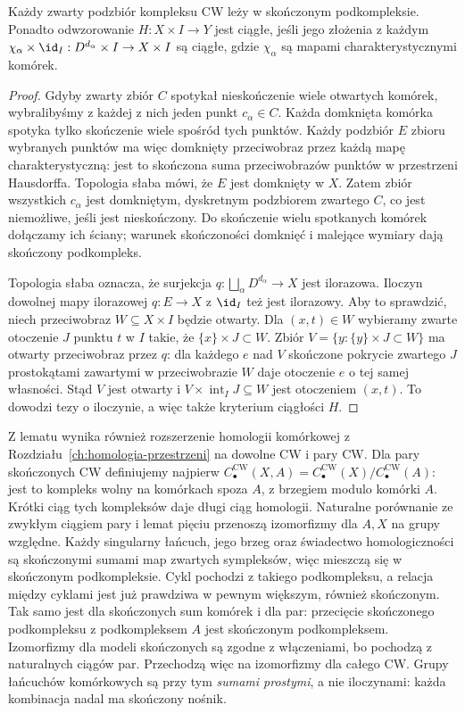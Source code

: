 \begin{lemat}
\label{lem:zwartosc-cw-pi}
Każdy zwarty podzbiór kompleksu CW leży w skończonym podkompleksie.
Ponadto odwzorowanie $H:X\times I\to Y$ jest ciągłe, jeśli jego złożenia
z każdym $\chi_\alpha\times\id_I:D^{d_\alpha}\times I\to X\times I$
są ciągłe, gdzie $\chi_\alpha$ są mapami charakterystycznymi komórek.
\end{lemat}
\begin{proof}
Gdyby zwarty zbiór $C$ spotykał nieskończenie wiele otwartych komórek,
wybralibyśmy z każdej z nich jeden punkt $c_\alpha\in C$.
Każda domknięta komórka spotyka tylko skończenie wiele spośród tych punktów.
Każdy podzbiór $E$ zbioru wybranych punktów ma więc domknięty
przeciwobraz przez każdą mapę charakterystyczną: jest to skończona
suma przeciwobrazów punktów w przestrzeni Hausdorffa.
Topologia słaba mówi, że $E$ jest domknięty w $X$.
Zatem zbiór wszystkich $c_\alpha$ jest domkniętym, dyskretnym
podzbiorem zwartego $C$, co jest niemożliwe, jeśli jest nieskończony.
Do skończenie wielu spotkanych komórek dołączamy ich ściany;
warunek skończoności domknięć i malejące wymiary dają skończony podkompleks.

Topologia słaba oznacza, że surjekcja
$q:\bigsqcup_\alpha D^{d_\alpha}\to X$ jest ilorazowa.
Iloczyn dowolnej mapy ilorazowej $q:E\to X$ z $\id_I$ też jest ilorazowy.
Aby to sprawdzić, niech przeciwobraz $W\subseteq X\times I$ będzie otwarty.
Dla $(x,t)\in W$ wybieramy zwarte otoczenie $J$ punktu $t$ w $I$
takie, że $\{x\}\times J\subset W$. Zbiór
$V=\{y:\{y\}\times J\subset W\}$ ma otwarty przeciwobraz przez $q$:
dla każdego $e$ nad $V$ skończone pokrycie zwartego $J$
prostokątami zawartymi w przeciwobrazie $W$ daje otoczenie $e$
o tej samej własności. Stąd $V$ jest otwarty i
$V\times\operatorname{int}_I J\subseteq W$ jest otoczeniem $(x,t)$.
To dowodzi tezy o iloczynie, a więc także kryterium ciągłości $H$.
\end{proof}

Z lematu wynika również rozszerzenie homologii komórkowej
z Rozdziału~\ref{ch:homologia-przestrzeni} na dowolne CW i pary CW.
Dla pary skończonych CW definiujemy najpierw
$C_\bullet^{\mathrm{CW}}(X,A)=C_\bullet^{\mathrm{CW}}(X)/C_\bullet^{\mathrm{CW}}(A)$:
jest to kompleks wolny na komórkach spoza $A$, z brzegiem modulo komórki $A$.
Krótki ciąg tych kompleksów daje długi ciąg homologii.
Naturalne porównanie ze zwykłym ciągiem pary i lemat pięciu
przenoszą izomorfizmy dla $A,X$ na grupy względne.
Każdy singularny łańcuch, jego brzeg oraz świadectwo homologiczności
są skończonymi sumami map zwartych sympleksów, więc mieszczą się
w skończonym podkompleksie. Cykl pochodzi z takiego podkompleksu,
a relacja między cyklami jest już prawdziwa w pewnym większym,
również skończonym. Tak samo jest dla skończonych sum komórek
i dla par: przecięcie skończonego podkompleksu z podkompleksem $A$
jest skończonym podkompleksem. Izomorfizmy dla modeli skończonych
są zgodne z włączeniami, bo pochodzą z naturalnych ciągów par.
Przechodzą więc na izomorfizmy dla całego CW.
Grupy łańcuchów komórkowych są przy tym \emph{sumami prostymi},
a nie iloczynami: każda kombinacja nadal ma skończony nośnik.

